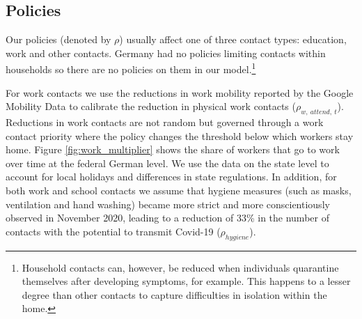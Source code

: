 \subsection{Policies}
\label{subsec:policies}

Our policies (denoted by $\rho$) usually affect one of three contact types: education,
work and other contacts.
Germany had no policies limiting contacts within households so there are no policies on
them in our model.\footnote{Household contacts can, however, be reduced when individuals
quarantine themselves after developing symptoms, for example. This happens to a lesser
degree than other contacts to capture difficulties in isolation within the home.}


For work contacts we use the reductions in work mobility reported by the Google Mobility
Data \citep{Google2021} to calibrate the reduction in physical work contacts
($\rho_{w,\:attend,\:t}$). Reductions in work contacts are not random but governed
through a work contact priority where the policy changes the threshold below which
workers stay home. Figure \ref{fig:work_multiplier} shows the share of workers that go to
work over time at the federal German level. We use the data on the state level to account
for local holidays and differences in state regulations.
In addition, for both work and school contacts we assume that hygiene measures (such as
masks, ventilation and hand washing) became more strict and more conscientiously observed
in November 2020, leading to a reduction of 33\% in the number of contacts with the potential
to transmit Covid-19 ($\rho_{hygiene}$).


